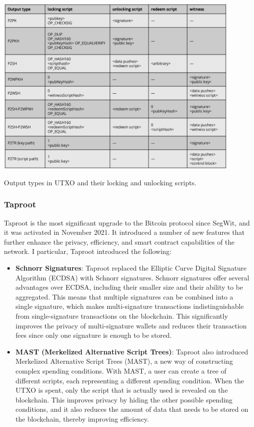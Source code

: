 \begin{table}[t]
	\begin{center}
		\includegraphics[width=0.9\textwidth]{./figs/scripts}
		\caption{Output types in UTXO and their locking and unlocking scripts.}		
		\label{fig:btc-scripts}
	\end{center}	
\end{table}

\subsubsection{Taproot}\label{taproot}

Taproot is the most significant upgrade to the Bitcoin protocol since
SegWit, and it was activated in November 2021. It introduced a number of
new features that further enhance the privacy, efficiency, and smart
contract capabilities of the network. I  particular, Taproot introduced the following:

\begin{itemize}
	\item
	\textbf{Schnorr Signatures}: Taproot replaced the Elliptic Curve
	Digital Signature Algorithm (ECDSA) with Schnorr signatures. Schnorr
	signatures offer several advantages over ECDSA, including their
	smaller size and their ability to be aggregated. This means that
	multiple signatures can be combined into a single signature, which
	makes multi-signature transactions indistinguishable from
	single-signature transactions on the blockchain. This significantly
	improves the privacy of multi-signature wallets and reduces their
	transaction fees since only one signature is enough to be stored.
	\item
	\textbf{MAST (Merkelized Alternative Script Trees)}: Taproot also
	introduced Merkelized Alternative Script Trees (MAST), a new way of
	constructing complex spending conditions. With MAST, a user can create
	a tree of different scripts, each representing a different spending
	condition. When the UTXO is spent, only the script that is actually
	used is revealed on the blockchain. This improves privacy by hiding
	the other possible spending conditions, and it also reduces the amount
	of data that needs to be stored on the blockchain, thereby improving
	efficiency.
\end{itemize}

